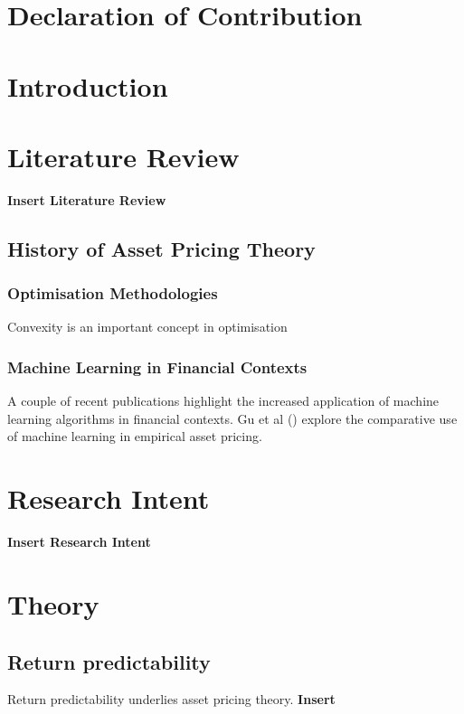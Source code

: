 \documentclass[12pt]{article}
\begin{document}
\section*{Declaration of Contribution}
\newpage
\tableofcontents
\newpage
\listoffigures
\listoftables
\newpage
\section{Introduction}
\newpage
\section{Literature Review}\label{LR}
\textbf{Insert Literature Review}
\subsection{History of Asset Pricing Theory}

\subsubsection{Optimisation Methodologies}
Convexity is an important concept in optimisation 
\subsubsection{Machine Learning in Financial Contexts}
A couple of recent publications highlight the increased application of machine learning algorithms in financial contexts.
\cite{corporate-culture}
Gu et al (\citeyear{eapvml}) explore the comparative use of machine learning in empirical asset pricing.

\section{Research Intent}
\textbf{Insert Research Intent}
\section{Theory}
\subsection{Return predictability}
Return predictability underlies asset pricing theory. 
\textbf{Insert}
\end{document}
